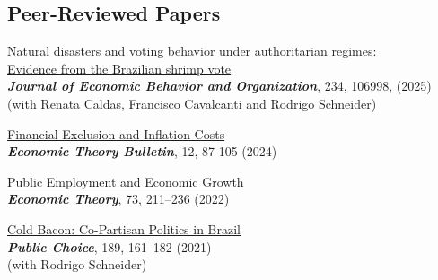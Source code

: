 \documentclass[mm, 10pt]{simple_style}
\begin{document}
\begin{resume}
\section{Peer-Reviewed Papers}
\href{https://doi.org/10.1016/j.jebo.2025.106998}{Natural disasters and voting behavior under authoritarian regimes:\\ Evidence from the Brazilian shrimp vote} \\
\textbf{\textit{Journal of Economic Behavior and Organization}}, 234, 106998, (2025) \\
(with Renata Caldas, Francisco Cavalcanti and Rodrigo Schneider) 

\href{https://doi.org/10.1007/s40505-024-00265-x}{Financial Exclusion and Inflation Costs}\\
\textbf{\textit{Economic Theory Bulletin}}, 12, 87-105 (2024) 


\href{https://doi.org/10.1007/s00199-020-01333-6}{Public Employment and Economic Growth}\\
\textbf{\textit{Economic Theory}}, 73, 211–236 (2022)  

\href{https://doi.org/10.1007/s11127-020-00869-4}{Cold Bacon: Co-Partisan Politics in Brazil} \\
\textbf{\textit{Public Choice}}, 189, 161–182 (2021) \\
(with Rodrigo Schneider) 


\end{resume}
\end{document}
